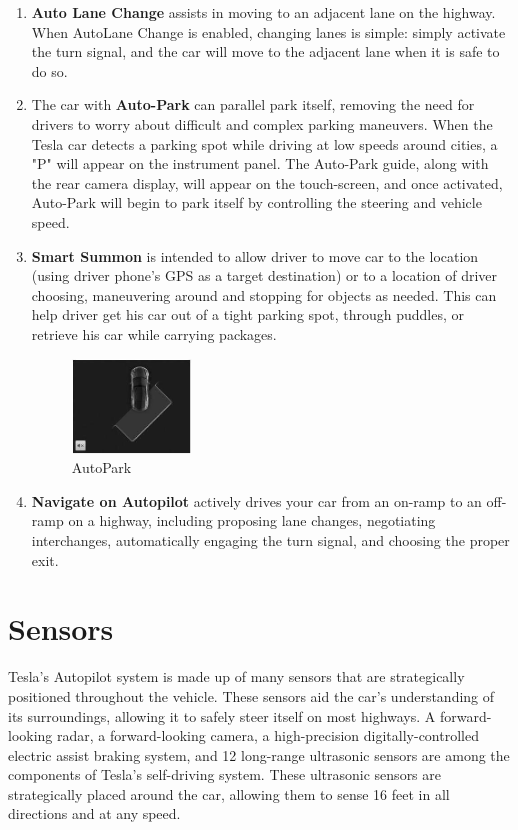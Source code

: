 \documentclass[letterpaper, 10 pt, conference]{ieeeconf}  %
\begin{document}
\begin{enumerate}
    \item \textbf{Auto Lane Change} assists in moving to an adjacent lane on the highway. When AutoLane Change is enabled, changing lanes is simple: simply activate the turn signal, and the car will move to the adjacent lane when it is safe to do so.
    
    \item The car with \textbf{Auto-Park} can parallel park itself, removing the need for drivers to worry about difficult and complex parking maneuvers. When the Tesla car detects a parking spot while driving at low speeds around cities, a "P" will appear on the instrument panel. The Auto-Park guide, along with the rear camera display, will appear on the touch-screen, and once activated, Auto-Park will begin to park itself by controlling the steering and vehicle speed.

    \item \textbf{Smart Summon} is intended to allow driver to move car to the location (using driver phone's GPS as a target destination) or to a location of driver choosing, maneuvering around and stopping for objects as needed. This can help driver get his car out of a tight parking spot, through puddles, or retrieve his car while carrying packages.

    \begin{figure}[hbt!]
    \centering
    \includegraphics[width=0.3\textwidth]{gfx/Autopark.jpg}
    \caption{AutoPark}
    \end{figure}
    
    \item \textbf{Navigate on Autopilot} actively drives your car from an on-ramp to an off-ramp on a highway, including proposing lane changes, negotiating interchanges, automatically engaging the turn signal, and choosing the proper exit.
\end{enumerate}

\section{Sensors}

Tesla's Autopilot system is made up of many sensors that are strategically positioned throughout the vehicle. These sensors aid the car's understanding of its surroundings, allowing it to safely steer itself on most highways. A forward-looking radar, a forward-looking camera, a high-precision digitally-controlled electric assist braking system, and 12 long-range ultrasonic sensors are among the components of Tesla's self-driving system. These ultrasonic sensors are strategically placed around the car, allowing them to sense 16 feet in all directions and at any speed\cite{polyarush2019does}.
\end{document}
